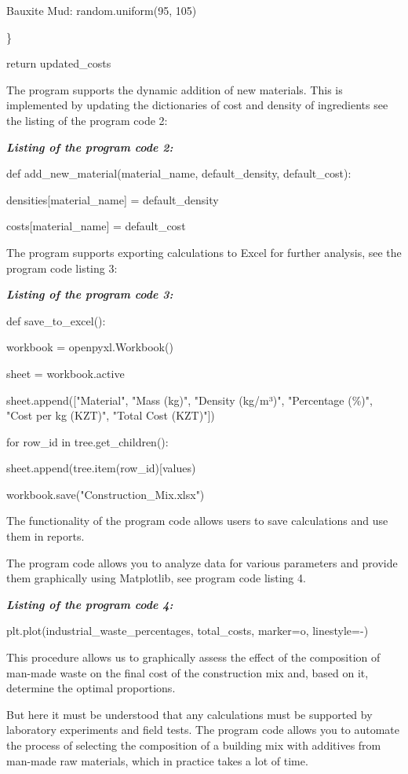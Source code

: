 \documentclass[
]{article}
\begin{document}
\textquotesingle Bauxite Mud\textquotesingle: random.uniform(95, 105)

\}

return updated\_costs

The program supports the dynamic addition of new materials. This is
implemented by updating the dictionaries of cost and density of
ingredients see the listing of the program code 2:

\emph{\textbf{Listing of the program code 2:}}

def add\_new\_material(material\_name, default\_density, default\_cost):

densities{[}material\_name{]} = default\_density

costs{[}material\_name{]} = default\_cost

The program supports exporting calculations to Excel for further
analysis, see the program code listing 3:

\emph{\textbf{Listing of the program code 3:}}

def save\_to\_excel():

workbook = openpyxl.Workbook()

sheet = workbook.active

sheet.append({[}"Material", "Mass (kg)", "Density (kg/m³)", "Percentage
(\%)", "Cost per kg (KZT)", "Total Cost (KZT)"{]})

for row\_id in tree.get\_children():

sheet.append(tree.item(row\_id){[}\textquotesingle values\textquotesingle{]})

workbook.save("Construction\_Mix.xlsx")

The functionality of the program code allows users to save calculations
and use them in reports.

The program code allows you to analyze data for various parameters and
provide them graphically using Matplotlib, see program code listing 4.

\emph{\textbf{Listing of the program code 4:}}

plt.plot(industrial\_waste\_percentages, total\_costs,
marker=\textquotesingle o\textquotesingle,
linestyle=\textquotesingle-\textquotesingle)

This procedure allows us to graphically assess the effect of the
composition of man-made waste on the final cost of the construction mix
and, based on it, determine the optimal proportions.

But here it must be understood that any calculations must be supported
by laboratory experiments and field tests. The program code allows you
to automate the process of selecting the composition of a building mix
with additives from man-made raw materials, which in practice takes a
lot of time.
\end{document}
